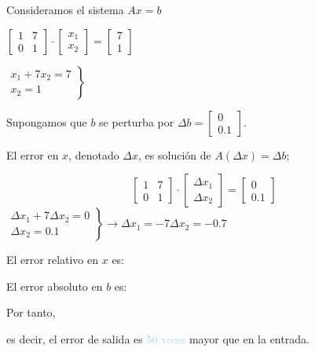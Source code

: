 \documentclass[12pt]{article}
\begin{document}
Consideramos el sistema $Ax=b$

$\begin{bmatrix}
1 & 7 \\ 
0 & 1
\end{bmatrix}\cdot\begin{bmatrix}
x_{1}\\
x_{2}
\end{bmatrix}=\begin{bmatrix}
7 \\ 
1
\end{bmatrix}$

$\left.\begin{array}{r}
x_{1}+7x_{2}=7\\
x_{2}=1
\end{array}\right\rbrace$

Supongamos que $b$ se perturba por $\Delta b=\begin{bmatrix}
0\\
0.1
\end{bmatrix}$.

El error en $x$, denotado $\Delta x$, es solución de $A(\Delta x)=\Delta b$;

\[\begin{bmatrix}
1 & 7 \\ 
0 & 1
\end{bmatrix}\cdot\begin{bmatrix}
\Delta x_{1}\\
\Delta x_{2}
\end{bmatrix}=\begin{bmatrix}
0 \\ 
0.1
\end{bmatrix}\]
$\left.\begin{array}{r}
\Delta x_{1}+7\Delta x_{2}=0\\
\Delta x_{2}=0.1
\end{array}\right\rbrace\longrightarrow\Delta x_{1}=-7\Delta x_{2}=-0.7$


El error relativo en $x$ es:\begin{center}
\end{center}
El error absoluto en $b$ es:\begin{center}
\end{center}
Por tanto, \begin{center}
\end{center} es decir, el error de salida es \textcolor{lightblue}{50 veces} mayor que en la entrada.
\end{document}
